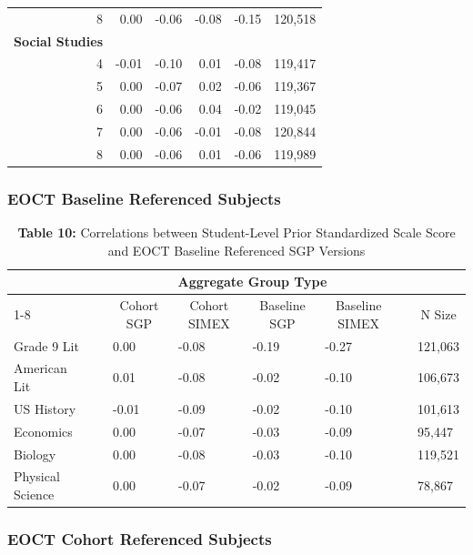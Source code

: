 \documentclass[12pt]{article}
\begin{document}
\begin{table}[!hbtp]
\begin{center}
\begin{normalsize}
\begin{tabular}{rrrrrr}
8& 0.00&-0.06&-0.08&-0.15&120,518\\ 
\textbf{Social Studies}&&&&&\\ 
4&-0.01&-0.10& 0.01&-0.08&119,417\\ 
5& 0.00&-0.07& 0.02&-0.06&119,367\\ 
6& 0.00&-0.06& 0.04&-0.02&119,045\\ 
7& 0.00&-0.06&-0.01&-0.08&120,844\\ 
8& 0.00&-0.06& 0.01&-0.06&119,989\\ 
\hline
\end{tabular}
\end{normalsize}
\end{center}
\end{table}

\color{black}

\subsubsection{EOCT Baseline Referenced
Subjects}\label{eoct-baseline-referenced-subjects}

\begin{table}[H]
\caption*{\textbf{Table 10:} Correlations between Student-Level Prior Standardized Scale Score and EOCT Baseline Referenced SGP Versions\label{table10}} 
\begin{center}
\begin{tabular}{lcllllcl}
\hline\hline
\multicolumn{1}{c}{\bfseries }&\multicolumn{1}{c}{\bfseries }&\multicolumn{4}{c}{\bfseries Aggregate Group Type}&\multicolumn{1}{c}{\bfseries }&\multicolumn{1}{c}{\bfseries }\tabularnewline
\cline{1-8}
\multicolumn{1}{c}{Content Area}&\multicolumn{1}{c}{}&\multicolumn{1}{c}{Cohort SGP}&\multicolumn{1}{c}{Cohort SIMEX}&\multicolumn{1}{c}{Baseline SGP}&\multicolumn{1}{c}{Baseline SIMEX}&\multicolumn{1}{c}{}&\multicolumn{1}{c}{N Size}\tabularnewline
\hline
Grade 9 Lit     && 0.00&-0.08&-0.19&-0.27&&121,063\tabularnewline
American Lit    && 0.01&-0.08&-0.02&-0.10&&106,673\tabularnewline
US History      &&-0.01&-0.09&-0.02&-0.10&&101,613\tabularnewline
Economics       && 0.00&-0.07&-0.03&-0.09&&95,447\tabularnewline
Biology         && 0.00&-0.08&-0.03&-0.10&&119,521\tabularnewline
Physical Science&& 0.00&-0.07&-0.02&-0.09&&78,867\tabularnewline
\hline
\end{tabular}\end{center}

\end{table}

\subsubsection{EOCT Cohort Referenced
Subjects}\label{eoct-cohort-referenced-subjects}
\end{document}
